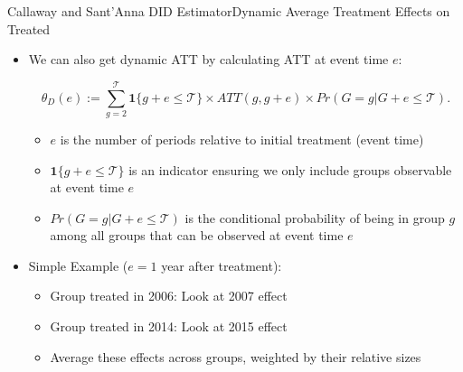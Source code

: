 \documentclass[dvipsnames,hyperref={pdfpagelabels=false}]{beamer}
\begin{document}
\begin{frame}{Callaway and Sant'Anna DID Estimator}{Dynamic Average Treatment Effects on Treated}
	\begin{itemize}
		\item[3] We can also get dynamic ATT by calculating ATT at event time $e$:
	
		\begin{equation*}
			\theta_D(e) := \sum_{g=2}^{\mathcal{T}} \mathbf{1} \{ g + e \leq \mathcal{T} \} \times ATT(g,g+e) \times Pr(G=g | G+e \leq \mathcal{T}).
		\end{equation*}
		\begin{itemize}
			\item $e$ is the number of periods relative to initial treatment (event time)
					\vspace{0.2cm}
			\item $\mathbf{1} \{ g + e \leq \mathcal{T} \}$ is an indicator ensuring we only include groups observable at event time $e$
					\vspace{0.2cm}
			\item $Pr(G=g | G+e \leq \mathcal{T})$ is the conditional probability of being in group $g$ among all groups that can be observed at event time $e$
		\end{itemize}
		\vspace{0.2cm}
		\item Simple Example ($e=1$ year after treatment):
		\vspace{0.2cm}
		\begin{itemize}
			\item Group treated in 2006: Look at 2007 effect
			\vspace{0.2cm}
			\item Group treated in 2014: Look at 2015 effect
			\vspace{0.2cm}
			\item Average these effects across groups, weighted by their relative sizes
		\end{itemize}
		
	\end{itemize}
\end{frame}
\end{document}
